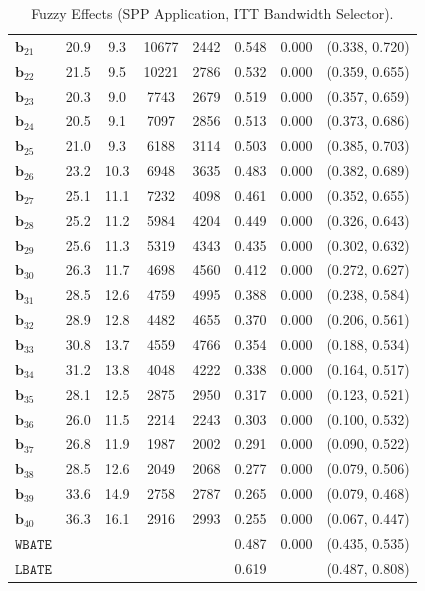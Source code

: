 \documentclass[10pt]{article}
\newcommand{\bb}{\mathbf{b}}
\begin{document}
\begin{table}[p]
\begin{tabular}{lccccccc}
   $\bb_{21}$ & 20.9 & 9.3 & 10677 & 2442 & 0.548 & 0.000 & (0.338, 0.720)\\
   $\bb_{22}$ & 21.5 & 9.5 & 10221 & 2786 & 0.532 & 0.000 & (0.359, 0.655)\\
   $\bb_{23}$ & 20.3 & 9.0 & 7743 & 2679 & 0.519 & 0.000 & (0.357, 0.659)\\
   $\bb_{24}$ & 20.5 & 9.1 & 7097 & 2856 & 0.513 & 0.000 & (0.373, 0.686)\\
   $\bb_{25}$ & 21.0 & 9.3 & 6188 & 3114 & 0.503 & 0.000 & (0.385, 0.703)\\
   $\bb_{26}$ & 23.2 & 10.3 & 6948 & 3635 & 0.483 & 0.000 & (0.382, 0.689)\\
   $\bb_{27}$ & 25.1 & 11.1 & 7232 & 4098 & 0.461 & 0.000 & (0.352, 0.655)\\
   $\bb_{28}$ & 25.2 & 11.2 & 5984 & 4204 & 0.449 & 0.000 & (0.326, 0.643)\\
   $\bb_{29}$ & 25.6 & 11.3 & 5319 & 4343 & 0.435 & 0.000 & (0.302, 0.632)\\
   $\bb_{30}$ & 26.3 & 11.7 & 4698 & 4560 & 0.412 & 0.000 & (0.272, 0.627)\\
   $\bb_{31}$ & 28.5 & 12.6 & 4759 & 4995 & 0.388 & 0.000 & (0.238, 0.584)\\
   $\bb_{32}$ & 28.9 & 12.8 & 4482 & 4655 & 0.370 & 0.000 & (0.206, 0.561)\\
   $\bb_{33}$ & 30.8 & 13.7 & 4559 & 4766 & 0.354 & 0.000 & (0.188, 0.534)\\
   $\bb_{34}$ & 31.2 & 13.8 & 4048 & 4222 & 0.338 & 0.000 & (0.164, 0.517)\\
   $\bb_{35}$ & 28.1 & 12.5 & 2875 & 2950 & 0.317 & 0.000 & (0.123, 0.521)\\
   $\bb_{36}$ & 26.0 & 11.5 & 2214 & 2243 & 0.303 & 0.000 & (0.100, 0.532)\\
   $\bb_{37}$ & 26.8 & 11.9 & 1987 & 2002 & 0.291 & 0.000 & (0.090, 0.522)\\
   $\bb_{38}$ & 28.5 & 12.6 & 2049 & 2068 & 0.277 & 0.000 & (0.079, 0.506)\\
   $\bb_{39}$ & 33.6 & 14.9 & 2758 & 2787 & 0.265 & 0.000 & (0.079, 0.468)\\
   $\bb_{40}$ & 36.3 & 16.1 & 2916 & 2993 & 0.255 & 0.000 & (0.067, 0.447)\\
  \midrule
   $\mathtt{WBATE}$ &  &  &  &  & 0.487 & 0.000 & (0.435, 0.535)\\
  \midrule
   $\mathtt{LBATE}$ &  &  &  &  & 0.619 &  & (0.487, 0.808)\\
  \bottomrule\bottomrule
\end{tabular}

    \caption{Fuzzy Effects (SPP Application, ITT Bandwidth Selector).}
    \label{tab:sa-empapp_main_fuzzy}
\end{table}
\end{document}
